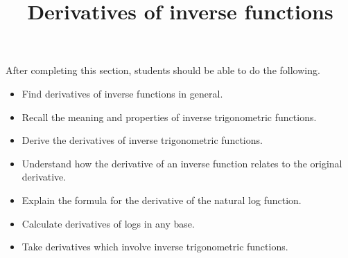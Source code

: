 \documentclass{ximera}
\title{Derivatives of inverse functions}
\begin{document}
\begin{abstract}
\end{abstract}

\maketitle

\begin{sectionOutcomes}

After completing this section, students should be able to do the following.

\begin{itemize}
	\item Find derivatives of inverse functions in general.
	\item Recall the meaning and properties of inverse trigonometric functions.
	\item Derive the derivatives of inverse trigonometric functions.
	\item Understand how the derivative of an inverse function relates to the original derivative.
	\item Explain the formula for the derivative of the natural log function.
	\item Calculate derivatives of logs in any base.
	\item Take derivatives which involve inverse trigonometric functions.
\end{itemize}

\end{sectionOutcomes}
\end{document}
